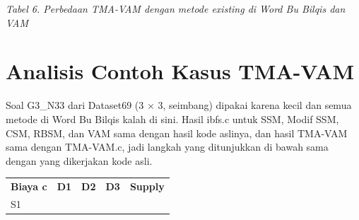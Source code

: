 \documentclass[10pt,a4paper]{article}
\newcounter{none}
\begin{document}
\emph{Tabel 6. Perbedaan TMA-VAM dengan metode existing di Word Bu
Bilqis dan VAM}

\section{Analisis Contoh Kasus TMA-VAM}\label{contoh-soal-yang-dimenangkan-tma-vam}

Soal G3\_N33 dari Dataset69 (3 × 3, seimbang) dipakai karena kecil dan
semua metode di Word Bu Bilqis kalah di sini. Hasil ibfs.c untuk SSM,
Modif SSM, CSM, RBSM, dan VAM sama dengan hasil kode aslinya, dan hasil
TMA-VAM sama dengan TMA-VAM.c, jadi langkah yang ditunjukkan di bawah
sama dengan yang dikerjakan kode asli.

{\def\LTcaptype{none} %
\begin{longtable}[]{@{}
  >{\raggedright\arraybackslash}p{}
  >{\raggedright\arraybackslash}p{}
  >{\raggedright\arraybackslash}p{}
  >{\raggedright\arraybackslash}p{}
  >{\raggedright\arraybackslash}p{}@{}}
\toprule\noalign{}
\begin{minipage}[b]{\linewidth}\raggedright
\textbf{Biaya c}
\end{minipage} & \begin{minipage}[b]{\linewidth}\centering
\textbf{D1}
\end{minipage} & \begin{minipage}[b]{\linewidth}\centering
\textbf{D2}
\end{minipage} & \begin{minipage}[b]{\linewidth}\centering
\textbf{D3}
\end{minipage} & \begin{minipage}[b]{\linewidth}\centering
\textbf{Supply}
\end{minipage} \\
\begin{minipage}[b]{\linewidth}\raggedright
S1
\end{minipage} & \begin{minipage}[b]{\linewidth}\centering
3
\end{minipage} & \begin{minipage}[b]{\linewidth}\centering
3
\end{minipage} & \begin{minipage}[b]{\linewidth}\centering

\end{minipage}
\end{longtable}}
\end{document}

